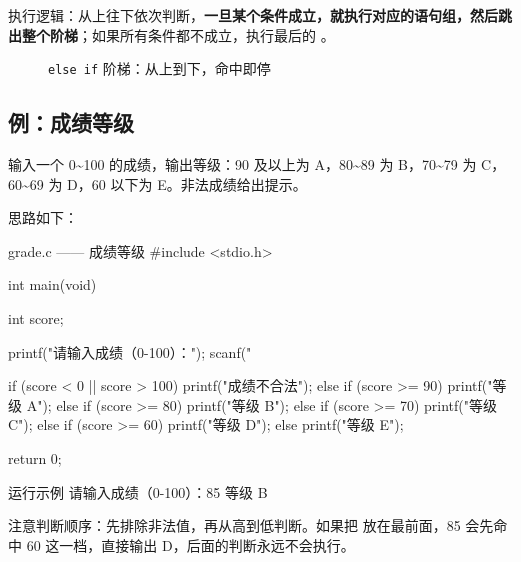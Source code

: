 执行逻辑：从上往下依次判断，\textbf{一旦某个条件成立，就执行对应的语句组，然后跳出整个阶梯}；如果所有条件都不成立，执行最后的 。

\begin{figure}[htbp]
  \centering
  \caption{\texttt{else if} 阶梯：从上到下，命中即停}
  \label{fig:elseif}
\end{figure}

\subsection{例：成绩等级}

\begin{example}
输入一个 0\textasciitilde100 的成绩，输出等级：90 及以上为 A，80\textasciitilde89 为 B，70\textasciitilde79 为 C，60\textasciitilde69 为 D，60 以下为 E。非法成绩给出提示。
\end{example}
\begin{solution}
思路如下：

\begin{codebox}{grade.c —— 成绩等级}
#include <stdio.h>

int main(void)
{
    int score;

    printf("请输入成绩（0-100）：");
    scanf("%

    if (score < 0 || score > 100) {
        printf("成绩不合法\n");
    } else if (score >= 90) {
        printf("等级 A\n");
    } else if (score >= 80) {
        printf("等级 B\n");
    } else if (score >= 70) {
        printf("等级 C\n");
    } else if (score >= 60) {
        printf("等级 D\n");
    } else {
        printf("等级 E\n");
    }

    return 0;
}
\end{codebox}

\begin{outbox}{运行示例}
请输入成绩（0-100）：85
等级 B
\end{outbox}

注意判断顺序：先排除非法值，再从高到低判断。如果把  放在最前面，85 会先命中 60 这一档，直接输出 D，后面的判断永远不会执行。
\end{solution}

